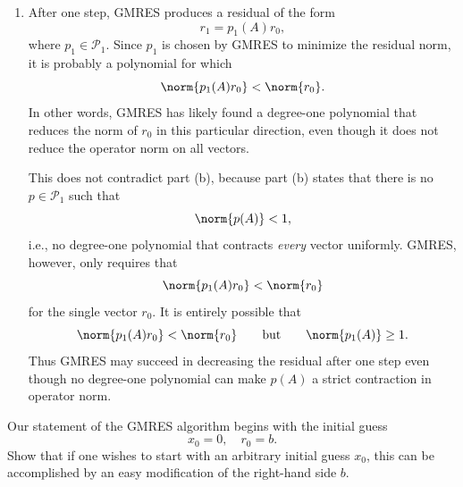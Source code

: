 \documentclass{ctexart}
\begin{document}
\begin{solution}
\begin{enumerate}
        But \(\sigma(A)\) has the property described in part (a), namely that
        \(0\) is an interior point of \(\operatorname{conv}(\sigma(A))\). Applying
        part (a) with \(S=\sigma(A)\), we conclude that no such \(p\in\mathcal{P}_1\)
        can exist. This contradiction shows that there is no \(p\in\mathcal{P}_1\)
        such that
        \[
          \norm{p(A)}<1.
        \]

      \item After one step, GMRES produces a residual of the form
        \[
          r_1 = p_1(A)r_0,
        \]
        where \(p_1\in\mathcal{P}_1\). Since \(p_1\) is chosen by GMRES to minimize
        the residual norm, it is probably a polynomial for which
        \[
          \norm{p_1(A)r_0} < \norm{r_0}.
        \]
        In other words, GMRES has likely found a degree-one polynomial that reduces
        the norm of \(r_0\) in this particular direction, even though it does not
        reduce the operator norm on all vectors.

        This does not contradict part (b), because part (b) states that there is no
        \(p\in\mathcal{P}_1\) such that
        \[
          \norm{p(A)}<1,
        \]
        i.e., no degree-one polynomial that contracts \emph{every} vector uniformly.
        GMRES, however, only requires that
        \[
          \norm{p_1(A)r_0} < \norm{r_0}
        \]
        for the single vector \(r_0\). It is entirely possible that
        \[
          \norm{p_1(A)r_0} < \norm{r_0}
          \qquad\text{but}\qquad
          \norm{p_1(A)} \ge 1.
        \]
        Thus GMRES may succeed in decreasing the residual after one step even though
        no degree-one polynomial can make \(p(A)\) a strict contraction in operator norm.
    \end{enumerate}

  \end{solution}
  \begin{problem}\label{pro:7}
    Our statement of the GMRES algorithm begins with the initial guess
    \[
      x_0 = 0, \quad r_0 = b.
    \]
    Show that if one wishes to start with an arbitrary initial guess $x_0$,
    this can be accomplished by an easy modification of the right-hand side $b$.
  \end{problem}
\end{document}
